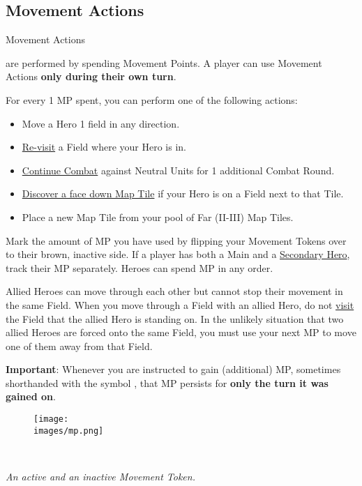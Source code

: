 \subsection*{Movement Actions}
\hypertarget{Movement}{Movement Actions} are performed by spending Movement Points.
A player can use Movement Actions \textbf{only during their own turn}.\par
For every 1 MP spent, you can perform one of the following actions:
\begin{itemize}
    \item Move a Hero 1 field in any direction.
    \item \hyperlink{Categories}{Re-visit} a Field where your Hero is in.
    \item \hyperlink{Timelimit}{Continue Combat} against Neutral Units for 1 additional Combat Round.
    \item \hyperlink{Placing}{Discover a face down Map Tile} if your Hero is on a Field next to that Tile.
    \item Place a new Map Tile from your pool of Far (II-III) Map Tiles.
\end{itemize}
Mark the amount of MP you have used by flipping your Movement Tokens over to their brown, inactive side.
If a player has both a Main and a \hyperlink{Secondary}{Secondary Hero}, track their MP separately.
Heroes can spend MP in any order.\par
Allied Heroes can move through each other but cannot stop their movement in the same Field.
When you move through a Field with an allied Hero, do not \hyperlink{Categories}{visit} the Field that the allied Hero is standing on.
In the unlikely situation that two allied Heroes are forced onto the same Field, you must use your next MP to move one of them away from that Field.\par
\textbf{Important}: Whenever you are instructed to gain (additional) MP, sometimes shorthanded with the symbol , that MP persists for \textbf{only the turn it was gained on}.
\begin{figure}[h]
\centering
\texttt{[image: \\images/mp.png]}
\end{figure}\\
\begin{center}
\textit{An active and an inactive Movement Token.}
\end{center}

\clearpage

